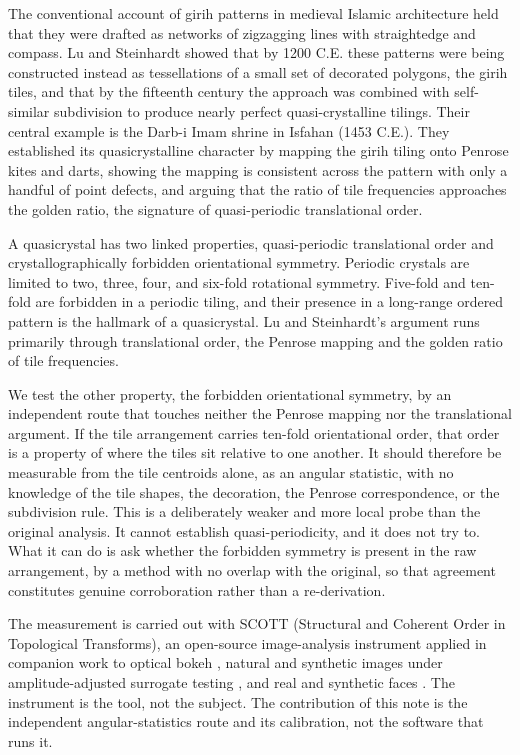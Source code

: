 \documentclass[11pt]{article}
\begin{document}
The conventional account of girih patterns in medieval Islamic architecture
held that they were drafted as networks of zigzagging lines with straightedge
and compass. Lu and Steinhardt \cite{lu2007} showed that by 1200 C.E. these
patterns were being constructed instead as tessellations of a small set of
decorated polygons, the girih tiles, and that by the fifteenth century the
approach was combined with self-similar subdivision to produce nearly perfect
quasi-crystalline tilings. Their central example is the Darb-i Imam shrine in
Isfahan (1453 C.E.). They established its quasicrystalline character by mapping
the girih tiling onto Penrose kites and darts, showing the mapping is consistent
across the pattern with only a handful of point defects, and arguing that the
ratio of tile frequencies approaches the golden ratio, the signature of
quasi-periodic translational order.

A quasicrystal has two linked properties, quasi-periodic translational order and
crystallographically forbidden orientational symmetry. Periodic crystals are
limited to two, three, four, and six-fold rotational symmetry. Five-fold and
ten-fold are forbidden in a periodic tiling, and their presence in a long-range
ordered pattern is the hallmark of a quasicrystal. Lu and Steinhardt's argument
runs primarily through translational order, the Penrose mapping and the golden
ratio of tile frequencies.

We test the other property, the forbidden orientational symmetry, by an
independent route that touches neither the Penrose mapping nor the translational
argument. If the tile arrangement carries ten-fold orientational order, that
order is a property of where the tiles sit relative to one another. It should
therefore be measurable from the tile centroids alone, as an angular statistic,
with no knowledge of the tile shapes, the decoration, the Penrose
correspondence, or the subdivision rule. This is a deliberately weaker and more
local probe than the original analysis. It cannot establish quasi-periodicity,
and it does not try to. What it can do is ask whether the forbidden symmetry is
present in the raw arrangement, by a method with no overlap with the original,
so that agreement constitutes genuine corroboration rather than a re-derivation.

The measurement is carried out with SCOTT (Structural and Coherent Order in
Topological Transforms), an open-source image-analysis instrument applied in
companion work to optical bokeh \cite{bokeh}, natural and synthetic images under
amplitude-adjusted surrogate testing \cite{iaaft}, and real and synthetic faces
\cite{bilateral}. The instrument is the tool, not the subject. The contribution
of this note is the independent angular-statistics route and its calibration,
not the software that runs it.
\end{document}
